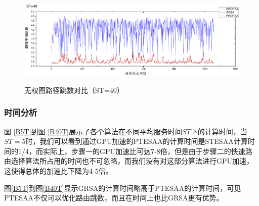 \begin{figure}
\setlength{\belowcaptionskip}{-0.5cm}
\begin{center}
{\includegraphics[width=1 \textwidth]{figures/B40H.pdf}}
\end{center}
\caption{{\footnotesize{无权图路径跳数对比（ST=40）}}}
\label{B40H}
\end{figure}
\subsubsection{时间分析}

图 \ref{B5T}到图 \ref{B40T}展示了各个算法在不同平均服务时间$ST$下的计算时间，当$ST=5$时，我们可以看到通过GPU加速的PTESAA的计算时间是STESAA计算时间的1/4，而实际上，步骤一的GPU加速比可达7-8倍，但是由于步骤二的快速路由选择算法所占用的时间也不可忽略，而我们没有对这部分算法进行GPU加速，这使得总体的加速比下降为4-5倍。

图\ref{B5T}到图\ref{B40T}显示GRSA的计算时间略高于PTESAA的计算时间，可见PTESAA不仅可以优化路由跳数，而且在时间上也比GRSA更有优势。

